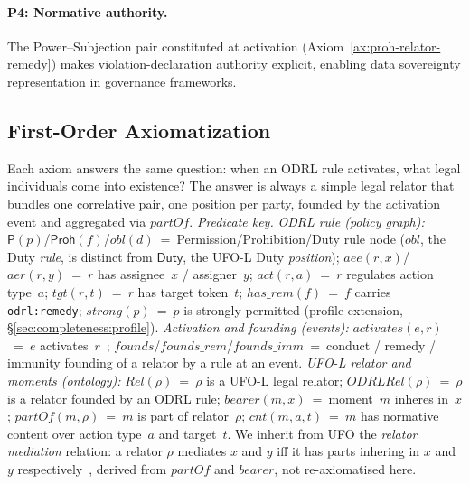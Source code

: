 \documentclass{IOS-Book-Article}
\newcommand{\activates}{\mathit{activates}}
\newcommand{\founds}{\mathit{founds}}
\newcommand{\Perm}{\mathsf{P}}           %
\newcommand{\hasrem}{\mathit{has\_rem}}
\newcommand{\Duty}{\mathsf{Duty}}            %
\newcommand{\Proh}{\mathsf{Proh}}
\newcommand{\odrl}[1]{\texttt{odrl:#1}}
\theoremstyle{definition}
\begin{document}
\paragraph{P4: Normative authority.}
The Power--Subjection pair constituted at activation
(Axiom~\ref{ax:proh-relator-remedy}) makes violation-declaration
authority explicit, enabling data sovereignty representation
in governance frameworks.
\subsection{First-Order Axiomatization}
\label{sec:grounding:axioms}
Each axiom answers the same question: when an ODRL rule activates, what legal individuals come into existence? The answer is always a simple legal relator that bundles one correlative pair, one position
per party, founded by the activation event and aggregated via $\mathit{partOf}$.
\noindent\textit{Predicate key.}
\emph{ODRL rule (policy graph):}
$\Perm(p)$/$\Proh(f)$/$\mathit{obl}(d)$~=~Permission/Prohibition/Duty
rule node ($\mathit{obl}$, the Duty \emph{rule}, is distinct from
$\Duty$, the UFO-L Duty \emph{position});
$\mathit{aee}(r,x)$/$\mathit{aer}(r,y)$~=~$r$ has assignee~$x$ / assigner~$y$;
$\mathit{act}(r,a)$~=~$r$ regulates action type~$a$;
$\mathit{tgt}(r,t)$~=~$r$ has target token~$t$;
$\hasrem(f)$~=~$f$ carries \odrl{remedy};
$\mathit{strong}(p)$~=~$p$ is strongly permitted (profile extension,
\S\ref{sec:completeness:profile}).
\emph{Activation and founding (events):}
$\activates(e,r)$~=~$e$ activates~$r$~\cite{odrl-formal-semantics};
$\founds$/$\mathit{founds\_rem}$/$\mathit{founds\_imm}$~=~conduct / remedy /
immunity founding of a relator by a rule at an event.
\emph{UFO-L relator and moments (ontology):}
$\mathit{Rel}(\rho)$~=~$\rho$ is a UFO-L legal relator;
$\mathit{ODRLRel}(\rho)$~=~$\rho$ is a relator founded by an ODRL rule;
$\mathit{bearer}(m,x)$~=~moment~$m$ inheres in~$x$;
$\mathit{partOf}(m,\rho)$~=~$m$ is part of relator~$\rho$;
$\mathit{cnt}(m,a,t)$~=~$m$ has normative content over action type~$a$
and target~$t$.
\noindent We inherit from UFO the \emph{relator mediation} relation:
a relator $\rho$ mediates $x$ and $y$ iff it has parts inhering in $x$ and $y$ respectively~\cite[p.~240]{Guizzardi2005ofscm}, derived from
$\mathit{partOf}$ and $\mathit{bearer}$, not re-axiomatised here.
\end{document}
